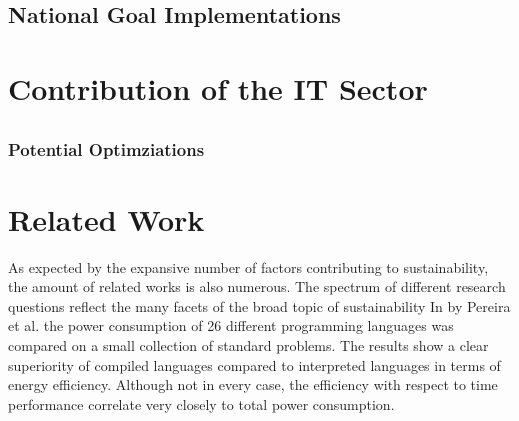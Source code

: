 \subsection{National Goal Implementations}\label{subsec:nationalGoals}

\section{Contribution of the IT Sector}\label{sec:ITContribution}
\subsection{}
\label{subsec:powerConsumption}
\subsubsection{Potential Optimziations}


\section{Related Work}\label{sec:relatedWork}

As expected by the expansive number of factors contributing to sustainability, the amount of related works is also numerous. The spectrum of different research questions reflect the many facets of the broad topic of sustainability
In \cite{10.1145/3136014.3136031} by Pereira et al. the power consumption of 26 different programming languages was compared on a small collection of standard problems. The results show a clear superiority of compiled languages compared to interpreted languages in terms of energy efficiency. Although not in every case, the efficiency with respect to time performance correlate very closely to total power consumption.